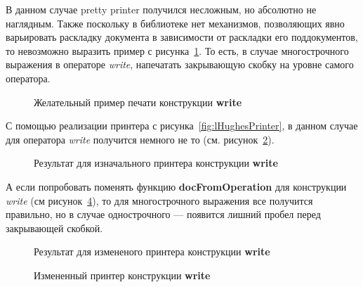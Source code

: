 В данном случае pretty printer получился несложным, но абсолютно не наглядным. Также поскольку в библиотеке нет механизмов, позволяющих явно варьировать раскладку документа в зависимости от раскладки его поддокументов, то невозможно выразить пример с рисунка~\ref{fig:lGoodWriteEx}.
То есть, в случае многострочного выражения в операторе \textit{write}, напечатать закрывающую скобку на уровне самого оператора.

\begin{figure}[h!]
	
	\caption{Желательный пример печати конструкции \textbf{write}}
	\label{fig:lGoodWriteEx}
\end{figure}

С помощью реализации принтера с рисунка~\ref{fig:lHughesPrinter}, в данном случае для оператора \textit{write} получится немного не то (см. рисунок~\ref{fig:lCurWriteEx}).
\begin{figure}[h!]
	
	\caption{Результат для изначального принтера конструкции \textbf{write}}
	\label{fig:lCurWriteEx}
\end{figure}

А если попробовать поменять функцию \textbf{docFromOperation} для конструкции \textit{write} (см рисунок~\ref{fig:lHughesWriteChange}),
то для многострочного выражения все получится правильно, но в случае однострочного --- появится лишний пробел перед закрывающей скобкой.

\begin{figure}[h!]
	
	\caption{Результат для измененого принтера конструкции \textbf{write}}
	\label{fig:lBadWriteEx}
\end{figure}

\begin{figure}[h!]
	
	\caption{Измененный принтер конструкции \textbf{write}}
	\label{fig:lHughesWriteChange}
\end{figure}